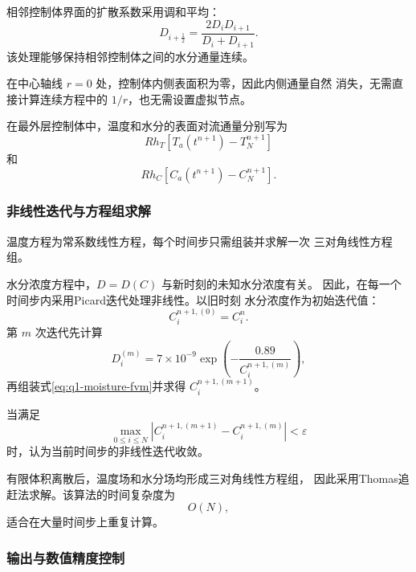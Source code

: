 \documentclass[12pt,a4paper]{article}
\begin{document}
相邻控制体界面的扩散系数采用调和平均：
\begin{equation}
D_{i+\frac12}
=
\frac{2D_iD_{i+1}}{D_i+D_{i+1}}.
\label{eq:q1-harmonic}
\end{equation}
该处理能够保持相邻控制体之间的水分通量连续。

在中心轴线 $r=0$ 处，控制体内侧表面积为零，因此内侧通量自然
消失，无需直接计算连续方程中的 $1/r$，也无需设置虚拟节点。

在最外层控制体中，温度和水分的表面对流通量分别写为
\begin{equation}
Rh_T\left[T_a(t^{n+1})-T_N^{n+1}\right]
\end{equation}
和
\begin{equation}
Rh_C\left[C_a(t^{n+1})-C_N^{n+1}\right].
\end{equation}

\subsubsection{非线性迭代与方程组求解}

温度方程为常系数线性方程，每个时间步只需组装并求解一次
三对角线性方程组。

水分浓度方程中，$D=D(C)$ 与新时刻的未知水分浓度有关。
因此，在每一个时间步内采用Picard迭代处理非线性。以旧时刻
水分浓度作为初始迭代值：
\begin{equation}
C_i^{n+1,(0)}=C_i^n.
\end{equation}
第 $m$ 次迭代先计算
\begin{equation}
D_i^{(m)}
=
7\times10^{-9}
\exp\left(
-\frac{0.89}{C_i^{n+1,(m)}}
\right),
\end{equation}
再组装式\eqref{eq:q1-moisture-fvm}并求得
$C_i^{n+1,(m+1)}$。

当满足
\begin{equation}
\max_{0\le i\le N}
\left|
C_i^{n+1,(m+1)}
-
C_i^{n+1,(m)}
\right|
<\varepsilon
\label{eq:q1-picard-stop}
\end{equation}
时，认为当前时间步的非线性迭代收敛。

有限体积离散后，温度场和水分场均形成三对角线性方程组，
因此采用Thomas追赶法求解。该算法的时间复杂度为
\begin{equation}
O(N),
\end{equation}
适合在大量时间步上重复计算。

\subsubsection{输出与数值精度控制}
\end{document}
